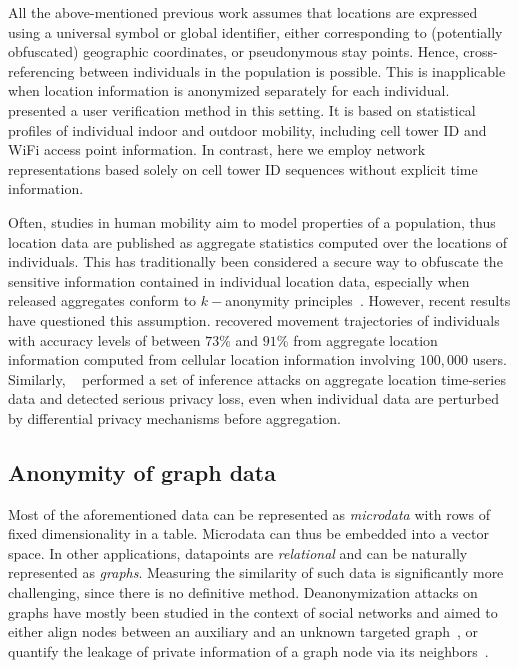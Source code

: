 All the above-mentioned previous work assumes that locations are expressed using a universal symbol or global identifier, either corresponding to (potentially obfuscated) geographic coordinates, or pseudonymous stay points.
Hence, cross-referencing between individuals in the population is possible.
This is inapplicable when location information is anonymized separately for each individual.
\textcite{LinMobile} presented a user verification method in this setting.
It is based on statistical profiles of individual indoor and outdoor mobility, including cell tower ID and WiFi access point information.
In contrast, here we employ network representations based solely on cell tower ID sequences without explicit time information.

Often, studies in human mobility aim to model properties of a population, thus location data are published as aggregate statistics computed over the locations of individuals.
This has traditionally been considered a secure way to obfuscate the sensitive information contained in individual location data, especially when released aggregates conform to $ k-$anonymity principles~\citep{sweeney2002k}.
However, recent results have questioned this assumption.
\textcite{xu2017trajectory} recovered movement trajectories of individuals with accuracy levels of between $73\%$ and $91\%$ from aggregate location information computed from cellular location information involving $100,000$ users. Similarly, ~\textcite{pyrgelis2017does} performed a set of inference attacks on aggregate location time-series data and detected serious privacy loss, even when individual data are perturbed by differential privacy mechanisms before aggregation.

\subsection{Anonymity of graph data }
Most of the aforementioned data can be represented as \emph{microdata} with rows of fixed dimensionality in a table.
Microdata can thus be embedded into a vector space.
In other applications, datapoints are \emph{relational} and can be naturally represented as \emph{graphs}.
Measuring the similarity of such data is significantly more challenging, since there is no definitive method.
Deanonymization attacks on graphs have mostly been studied in the context of social networks and aimed to either align nodes between an auxiliary and an unknown targeted graph~\citep{narayanan2009anonymizing, sharad2014}, or quantify the leakage of private information of a graph node via its neighbors~\citep{zheleva09}.

